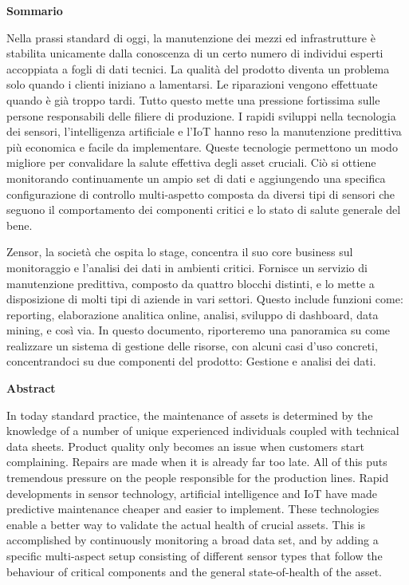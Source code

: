 \begin{center}
    \textbf{Sommario}
\end{center}
Nella prassi standard di oggi, la manutenzione dei mezzi ed infrastrutture è stabilita unicamente dalla conoscenza di un certo numero di individui esperti accoppiata a fogli di dati tecnici.
La qualità del prodotto diventa un problema solo quando i clienti iniziano a lamentarsi. Le riparazioni vengono effettuate quando è già troppo tardi. Tutto questo mette una pressione fortissima sulle persone responsabili delle filiere di produzione. 
I rapidi sviluppi nella tecnologia dei sensori, l'intelligenza artificiale e l'\acl{IoT} hanno reso la manutenzione predittiva più economica e facile da implementare. Queste tecnologie permettono un modo migliore per convalidare la salute effettiva degli asset cruciali. 
Ciò si ottiene monitorando continuamente un ampio set di dati e aggiungendo una specifica configurazione di controllo multi-aspetto composta da diversi tipi di sensori che seguono il comportamento dei componenti critici e lo stato di salute generale del bene.

Zensor, la società che ospita lo stage, concentra il suo core business sul monitoraggio e l'analisi dei dati in ambienti critici. Fornisce un servizio di manutenzione predittiva, composto da quattro blocchi distinti, e lo mette a disposizione di molti tipi di aziende in vari settori. 
Questo include funzioni come: reporting, elaborazione analitica online, analisi, sviluppo di dashboard, data mining, e così via.
In questo documento, riporteremo una panoramica su come realizzare un sistema di gestione delle risorse, con alcuni casi d'uso concreti, concentrandoci su due componenti del prodotto: Gestione e analisi dei dati.
\cleardoublepage

\begin{center}
    \textbf{Abstract}
\end{center}

In today standard practice, the maintenance of assets is determined by the knowledge of a number of unique experienced individuals coupled with technical data sheets.
Product quality only becomes an issue when customers start complaining. Repairs are made when it is already far too late. All of this puts tremendous pressure on the people responsible for the production lines. 
Rapid developments in sensor technology, artificial intelligence and \acl{IoT} have made predictive maintenance cheaper and easier to implement. These technologies enable a better way to validate the actual health of crucial assets. 
This is accomplished by continuously monitoring a broad data set, and by adding a specific multi-aspect setup consisting of different sensor types that follow the behaviour of critical components and the general state-of-health of the asset.

